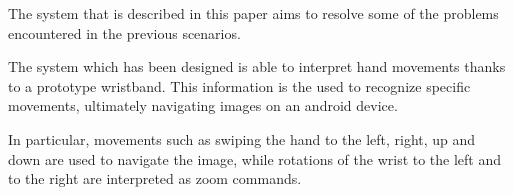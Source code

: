 The system that is described in this paper aims to resolve some of the problems encountered in the previous scenarios.

The system which has been designed is able to interpret hand movements thanks to a prototype wristband. This information is the used to recognize specific movements, ultimately navigating images on an android device.

In particular, movements such as swiping the hand to the left, right, up and down are used to navigate the image,
while rotations of the wrist to the left and to the right are interpreted as zoom commands.

